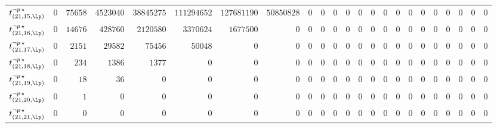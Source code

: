 \begin{tabular}{r|rrrrrrrrrrrrrrrrrrrrrr}
  $t^{\neg p \, \star}_{(21,15,\Lp)}$ & $0$ & $75658$ & $4523040$ & $38845275$ & $111294652$ & $127681190$ & $50850828$ & $0$ & $0$ & $0$ & $0$ & $0$ & $0$ & $0$ & $0$ & $0$ & $0$ & $0$ & $0$ & $0$ & $0$ & $0$ \\
  $t^{\neg p \, \star}_{(21,16,\Lp)}$ & $0$ & $14676$ & $428760$ & $2120580$ & $3370624$ & $1677500$ & $0$ & $0$ & $0$ & $0$ & $0$ & $0$ & $0$ & $0$ & $0$ & $0$ & $0$ & $0$ & $0$ & $0$ & $0$ & $0$ \\
  $t^{\neg p \, \star}_{(21,17,\Lp)}$ & $0$ & $2151$ & $29582$ & $75456$ & $50048$ & $0$ & $0$ & $0$ & $0$ & $0$ & $0$ & $0$ & $0$ & $0$ & $0$ & $0$ & $0$ & $0$ & $0$ & $0$ & $0$ & $0$ \\
  $t^{\neg p \, \star}_{(21,18,\Lp)}$ & $0$ & $234$ & $1386$ & $1377$ & $0$ & $0$ & $0$ & $0$ & $0$ & $0$ & $0$ & $0$ & $0$ & $0$ & $0$ & $0$ & $0$ & $0$ & $0$ & $0$ & $0$ & $0$ \\
  $t^{\neg p \, \star}_{(21,19,\Lp)}$ & $0$ & $18$ & $36$ & $0$ & $0$ & $0$ & $0$ & $0$ & $0$ & $0$ & $0$ & $0$ & $0$ & $0$ & $0$ & $0$ & $0$ & $0$ & $0$ & $0$ & $0$ & $0$ \\
  $t^{\neg p \, \star}_{(21,20,\Lp)}$ & $0$ & $1$ & $0$ & $0$ & $0$ & $0$ & $0$ & $0$ & $0$ & $0$ & $0$ & $0$ & $0$ & $0$ & $0$ & $0$ & $0$ & $0$ & $0$ & $0$ & $0$ & $0$ \\
  $t^{\neg p \, \star}_{(21,21,\Lp)}$ & $0$ & $0$ & $0$ & $0$ & $0$ & $0$ & $0$ & $0$ & $0$ & $0$ & $0$ & $0$ & $0$ & $0$ & $0$ & $0$ & $0$ & $0$ & $0$ & $0$ & $0$ & $0$ \\
\end{tabular}
